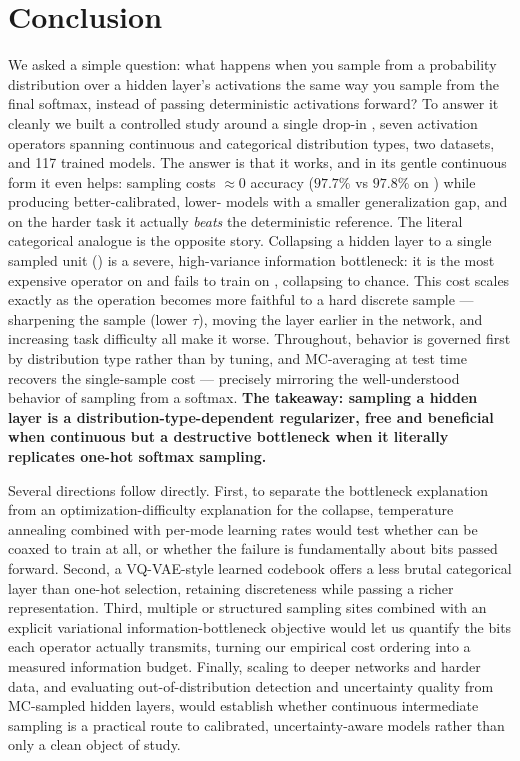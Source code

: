 \section{Conclusion}\label{sec:conclusion}

We asked a simple question: what happens when you sample from a probability distribution over a hidden layer's activations the same way you sample from the final softmax, instead of passing deterministic activations forward? To answer it cleanly we built a controlled study around a single drop-in \samplinglayer, seven activation operators spanning continuous and categorical distribution types, two datasets, and 117 trained models. The answer is that it works, and in its gentle continuous form it even helps: \gaussreparam sampling costs $\approx0$ accuracy ($97.7\%$ vs $97.8\%$ on \mnist) while producing better-calibrated, lower-\nll{} models with a smaller generalization gap, and on the harder \cifar task it actually \emph{beats} the deterministic reference. The literal categorical analogue is the opposite story. Collapsing a hidden layer to a single sampled unit (\gumbelst) is a severe, high-variance information bottleneck: it is the most expensive operator on \mnist and fails to train on \cifar, collapsing to chance. This cost scales exactly as the operation becomes more faithful to a hard discrete sample --- sharpening the sample (lower $\tau$), moving the layer earlier in the network, and increasing task difficulty all make it worse. Throughout, behavior is governed first by distribution type rather than by tuning, and MC-averaging at test time recovers the single-sample cost --- precisely mirroring the well-understood behavior of sampling from a softmax. \textbf{The takeaway: sampling a hidden layer is a distribution-type-dependent regularizer, free and beneficial when continuous but a destructive bottleneck when it literally replicates one-hot softmax sampling.}

Several directions follow directly. First, to separate the bottleneck explanation from an optimization-difficulty explanation for the \cifar collapse, temperature annealing combined with per-mode learning rates would test whether \gumbelst can be coaxed to train at all, or whether the failure is fundamentally about bits passed forward. Second, a VQ-VAE-style learned codebook \citep{oord2017vqvae} offers a less brutal categorical layer than one-hot selection, retaining discreteness while passing a richer representation. Third, multiple or structured sampling sites combined with an explicit variational information-bottleneck objective \citep{alemi2017deepvib} would let us quantify the bits each operator actually transmits, turning our empirical cost ordering into a measured information budget. Finally, scaling to deeper networks and harder data, and evaluating out-of-distribution detection and uncertainty quality from MC-sampled hidden layers, would establish whether continuous intermediate sampling is a practical route to calibrated, uncertainty-aware models rather than only a clean object of study.
